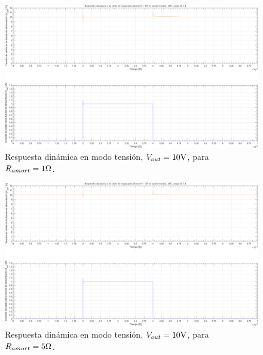 \clearpage

\begin{figure}[H] %
\begin{center}
\includegraphics[width=1.1 \textwidth, angle=90]{./img/plots/dynamic/power_supply_RAMORT_1_STEP_Modo1.png}
\caption{\label{fig:fig_power_supply_RAMORT_STEP_1_Modo1}\footnotesize{Respuesta dinámica en modo tensión, $V_{out} = 10 \si[per-mode=symbol]{\volt}$, para $R_{amort} = 1 \si[per-mode=symbol]{\ohm} $.}}
\end{center}
\end{figure}

\clearpage

\begin{figure}[H] %
\begin{center}
\includegraphics[width=1.1 \textwidth, angle=90]{./img/plots/dynamic/power_supply_RAMORT_5_STEP_Modo1.png}
\caption{\label{fig:fig_power_supply_RAMORT_STEP_5_Modo1}\footnotesize{Respuesta dinámica en modo tensión, $V_{out} = 10 \si[per-mode=symbol]{\volt}$, para $R_{amort} = 5 \si[per-mode=symbol]{\ohm} $.}}
\end{center}
\end{figure}


